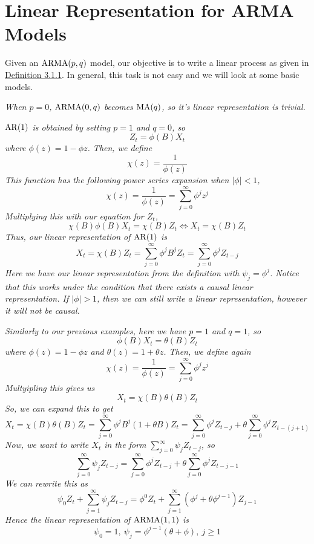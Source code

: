 \section{Linear Representation for ARMA Models}
Given an $\operatorname{ARMA}(p,q)$ model, our objective is to write a linear process as given in 
\hyperref[def:linear_process]{Definition 3.1.1}. In general, this task is not easy and we will look at some basic models.

\begin{example}[MA(q)]
    \emph{
        When $p=0$, $\operatorname{ARMA}(0,q)$ becomes $\operatorname{MA}(q)$, so it's linear representation is trivial.
    }
\end{example}

\begin{example}[AR(1)]\label{ex:ar1}
    \emph{
        $\operatorname{AR}(1)$ is obtained by setting $p=1$ and $q=0$, so 
        \[Z_t = \phi(B)X_t\]
        where $\phi(z) = 1-\phi z$. Then, we define 
        \[\chi(z) = \frac{1}{\phi(z)}\]
        This function has the following power series expansion when $|\phi| < 1$, 
        \[\chi(z) = \frac{1}{\phi(z)} = \sum_{j=0}^\infty \phi^jz^j\]
        Multiplying this with our equation for $Z_t$, 
        \[\chi(B)\phi(B)X_t = \chi(B)Z_t \iff X_t = \chi(B)Z_t\]
        Thus, our linear representation of $\operatorname{AR}(1)$ is 
        \[X_t = \chi(B)Z_t = \sum_{j=0}^\infty \phi^jB^jZ_t = \sum_{j=0}^\infty \phi^jZ_{t-j}\]
        Here we have our linear representation from the definition with $\psi_j = \phi^j$. Notice that this works under the condition that there exists a causal linear representation. If $|\phi| > 1$, then we can still write a linear representation, however it will not be causal.
    }
\end{example}

\begin{example}[ARMA(1,1)]\label{ex:linear_arma11}
    \emph{
        Similarly to our previous examples, here we have $p=1$ and $q=1$, so
        \[\phi(B)X_t = \theta(B)Z_t\]
        where $\phi(z) = 1 - \phi z$ and $\theta(z) = 1 + \theta z$. Then, we define again 
        \[\chi(z) = \frac{1}{\phi(z)} = \sum_{j=0}^\infty \phi^jz^j\]
        Multyipling this gives us 
        \[X_t = \chi(B)\theta(B)Z_t\]
        So, we can expand this to get 
        \[X_t = \chi(B)\theta(B)Z_t = \sum_{j=0}^\infty \phi^jB^j(1+\theta B)Z_t = \sum_{j=0}^\infty \phi^jZ_{t-j} + \theta\sum_{j=0}^\infty \phi^jZ_{t-(j+1)}\]
        Now, we want to write $X_t$ in the form $\sum\limits_{j=0}^\infty \psi_jZ_{t-j}$, so
        \[\sum_{j=0}^\infty \psi_jZ_{t-j} = \sum_{j=0}^\infty \phi^jZ_{t-j} + \theta\sum_{j=0}^\infty\phi^j Z_{t-j-1}\]
        We can rewrite this as 
        \[\psi_0Z_t + \sum_{j=1}^\infty \psi_jZ_{t-j} = \phi^0Z_t + \sum_{j=1}^\infty (\phi^j + \theta \phi^{j-1})Z_{j-1}\]
        Hence the linear representation of $\operatorname{ARMA}(1,1)$ is 
        \[\psi_0 = 1, \ \psi_j = \phi^{j-1}(\theta + \phi), \ j \geq 1\]
    }    
\end{example}

